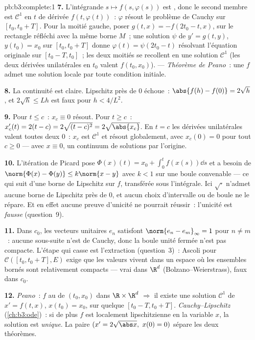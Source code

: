 \begin{solution}{pb:b3:complete:1}
\textbf{7.} L'intégrande $s \mapsto f(s, \varphi(s))$ est
, donc le second membre est $\mathcal C^1$ en $t$ de
dérivée $f(t, \varphi(t))$~: $\varphi$ résout le problème de
Cauchy sur $[t_0, t_0 + T]$. Pour la moitié gauche, poser
$g(t, x) = -f(2t_0 - t, x)$,  sur le rectangle
réfléchi avec la même borne $M$~; une solution $\psi$ de $y'
= g(t,y)$, $y(t_0) = x_0$ sur $[t_0, t_0 + T]$ donne
$\varphi(t) = \psi(2t_0 - t)$ résolvant l'équation originale
sur $[t_0 - T, t_0]$~; les deux moitiés se recollent en une
solution $\mathcal C^1$ (les deux dérivées unilatérales en
$t_0$ valent $f(t_0, x_0)$). --- \emph{Théorème de Peano}~:
une $f$  admet une solution locale par toute
condition initiale.

\textbf{8.} La continuité est claire. Lipschitz près de $0$
échoue~: $\abs{f(h) - f(0)} = 2\sqrt h$, et $2\sqrt h \leq L
h$ est faux pour $h < 4/L^2$.

\textbf{9.} Pour $t \leq c$~: $x_c \equiv 0$ résout. Pour $t
\geq c$~: $x_c'(t) = 2(t - c) = 2\sqrt{(t-c)^2} =
2\sqrt{\abs{x_c}}$. En $t = c$ les dérivées unilatérales
valent toutes deux $0$~: $x_c$ est $\mathcal C^1$ et résout
globalement, avec $x_c(0) = 0$ pour tout $c \geq 0$ --- avec
$x \equiv 0$, un continuum de solutions par l'origine.

\textbf{10.} L'itération de Picard pose $\Phi(x)(t) = x_0 +
\int_0^t f(x(s))\dd s$ et a besoin de $\norm{\Phi(x) -
\Phi(y)} \leq k\norm{x - y}$ avec $k < 1$ sur une boule
convenable --- ce qui suit d'une borne de Lipschitz sur $f$,
transférée sous l'intégrale. Ici $\sqrt\cdot$ n'admet aucune
borne de Lipschitz près de $0$, et aucun choix d'intervalle
ou de boule ne le répare. Et en effet aucune preuve
d'unicité ne pourrait réussir~: l'unicité est \emph{fausse}
(question~9).

\textbf{11.} Dans $c_0$, les vecteurs unitaires $e_n$
satisfont $\norm{e_n - e_m}_\infty = 1$ pour $n \neq m$~:
aucune sous-suite n'est de Cauchy, donc la boule unité
fermée n'est pas compacte. L'étape qui casse est l'extraction
(question~3)~: Ascoli pour $\mathcal C([t_0, t_0+T], E)$
exige que les valeurs vivent dans un espace où les ensembles
bornés sont relativement compacts --- vrai dans $\R^d$
(Bolzano--Weierstrass), faux dans $c_0$.

\textbf{12.} \emph{Peano}~: $f$  au  de
$(t_0, x_0)$ dans $\R\times\R^d$ $\Rightarrow$ il existe une
solution $\mathcal C^1$ de $x' = f(t,x)$, $x(t_0) = x_0$, sur
quelque $[t_0 - T, t_0 + T]$. \emph{Cauchy--Lipschitz}
(\cref{ch:b3:ode})~: si de plus $f$ est localement
lipschitzienne en la variable $x$, la solution est
\emph{unique}. La paire $(x' = 2\sqrt{\abs x},\ x(0) = 0)$
sépare les deux théorèmes.


\end{solution}
